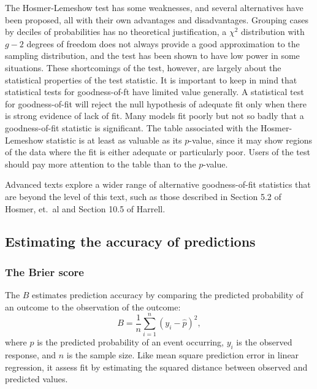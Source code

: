 The Hosmer-Lemeshow test has some weaknesses, and several alternatives have been proposed, all with their own advantages and disadvantages.  Grouping cases by deciles of probabilities has no theoretical justification, a $\chi^2$  distribution with $g - 2$ degrees of freedom does not always provide a good approximation to the sampling distribution, and the test has been shown to have low power in some situations.  These shortcomings of the test, however, are largely about the statistical properties of the test statistic.  It is important to keep in mind that statistical tests for goodness-of-ft have limited value generally.  A statistical test for goodness-of-fit will reject the null hypothesis of adequate fit only when there is strong evidence of lack of fit.  Many models fit poorly but not so badly that a goodness-of-fit statistic is significant.  The table associated with the Hosmer-Lemeshow statistic is at least as valuable as its $p$-value, since it may show regions of the data where the fit is either adequate or particularly poor. Users of the test should pay more attention to the table than to the $p$-value.

 Advanced texts explore a wider range of alternative goodness-of-fit statistics that are beyond the level of this text, such as those described in Section 5.2 of Hosmer, et.\ al and Section 10.5 of Harrell.


\subsection{Estimating the accuracy of predictions}
\label{section:predictiveAccuracy}

 \subsubsection{The Brier score}

The  $B$ estimates prediction accuracy by comparing the predicted probability of an outcome to the observation of the outcome:
       \[ B = \dfrac{1}{n}\sum_{i = 1}^n (y_i - \hat{p})^2,  \]
where $\hat{p}$ is the predicted probability of an event occurring, $y_i$ is the observed response, and $n$ is the sample size. Like mean square prediction error in linear regression, it assess fit by estimating the squared distance between observed and predicted values.

